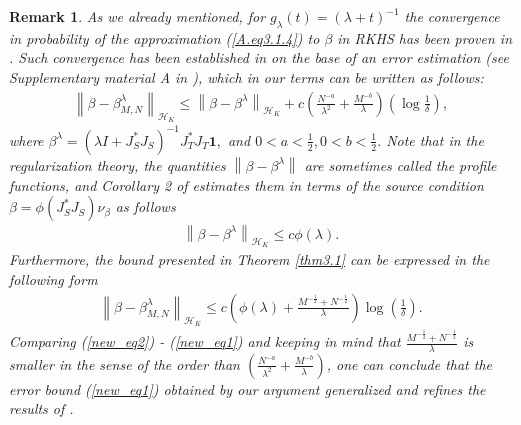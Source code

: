 \documentclass[USenglish]{article}
\newcommand{\norm}[1]{\left\lVert#1\right\rVert}
\newtheorem{remark}{Remark}
\begin{document}
\begin{remark}\label{rem_new2}
	As we already mentioned, for $ g_\lambda (t) = (\lambda + t)^{-1} $ the convergence in probability of the approximation (\ref{A.eq3.1.4}) to $ \beta $ in RKHS has been proven in \cite{schuster2020}. Such convergence has been established in \cite{schuster2020} on the base of an error estimation (see Supplementary material A in \cite{schuster2020}), which in our terms can be written as follows:
	\begin{align}\label{new_eq2}
	\norm{\beta - \beta_{M,N}^\lambda}_{\mathcal{H}_K} \leq \norm{\beta - \beta^\lambda}_{\mathcal{H}_K} + c \left( \frac{N^{-a}}{\lambda^2} + \frac{M^{-b}}{\lambda}\right) \left( \log \frac{1}{\delta}\right),
	\end{align}
	where $ \beta^\lambda = (\lambda I + J_S^*J_S)^{-1} J_T^*J_T \mathbf{1}, $ and $ 0 < a < \frac{1}{2}, 0<b< \frac{1}{2}.$
	Note that in the regularization theory, the quantities $ \norm{\beta - \beta^\lambda} $ are sometimes called the profile functions, and Corollary 2 of \cite{mathe2008} estimates them in terms of the source condition $ \beta = \phi(J_S^*J_S)\nu_\beta $ as follows
	\begin{align}\label{new_eq3}
	\norm{\beta - \beta^\lambda}_{\mathcal{H}_K} \leq c \phi(\lambda).
	\end{align}
Furthermore, the bound presented in Theorem \ref{thm3.1} can be expressed in the following form
\begin{align}\label{new_eq1}
\norm{\beta - \beta_{M,N}^\lambda}_{\mathcal{H}_K} \leq c \left( \phi (\lambda) + \frac{M^{-\frac{1}{2}} + N^{-\frac{1}{2}}}{\lambda} \right) \log \left( \frac{1}{\delta}\right) .
\end{align}
Comparing (\ref{new_eq2}) - (\ref{new_eq1}) and keeping in mind that $ \frac{M^{-\frac{1}{2}} + N^{-\frac{1}{2}} }{\lambda} $ is smaller in the sense of the order than $ \left( \frac{N^{-a}}{\lambda^2} + \frac{M^{-b}}{\lambda}  \right) $, one can conclude that the error bound (\ref{new_eq1}) obtained by our argument generalized and refines the results of \cite{schuster2020}.
\end{remark}
\end{document}
